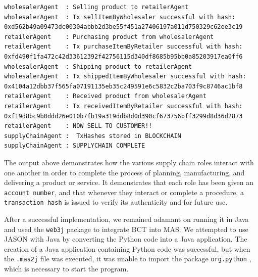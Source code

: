 \begin{lstlisting}[numbers=none, basicstyle=\ttfamily\tiny]
wholesalerAgent  : Selling product to retailerAgent
wholesalerAgent  : Tx sellItemByWholesaler successful with hash: 0xd562b49a09473dc00304abbb2d3be55f451a27406197a011d750329c62ee3c19
retailerAgent    : Purchasing product from wholesalerAgent
retailerAgent    : Tx purchaseItemByRetailer successful with hash: 0xfd490f1fa472c42d33612392f42756115d340df8685b95bb0a85203917ea0ff6
wholesalerAgent  : Shipping product to retailerAgent
wholesalerAgent  : Tx shippedItemByWholesaler successful with hash: 0x4104a12dbb37f565fa07191135eb35c249591e6c5832c2ba703f9c8746ac1bf8
retailerAgent    : Received product from wholesalerAgent
retailerAgent    : Tx receivedItemByRetailer successful with hash: 0xf19d8bc9b0ddd26e010b7fb19a319ddb8d0d390cf673756bff3299d8d36d2873
retailerAgent    : NOW SELL TO CUSTOMER!!
supplyChainAgent :  TxHashes stored in BLOCKCHAIN
supplyChainAgent : SUPPLYCHAIN COMPLETE
\end{lstlisting}

\vspace{.5cm}

The output above demonstrates how the various supply chain roles interact with one another in order to complete the process of planning, manufacturing, and delivering a product or service. It demonstrates that each role has been given an \texttt{account number}, and that whenever they interact or complete a procedure, a \texttt{transaction hash} is issued to verify its authenticity and for future use.

\vspace{.5cm}

After a successful implementation, we remained adamant on running it in Java and used the \texttt{web3j} package to integrate \ac{BCT} into \ac{MAS}. We attempted to use JASON with Java by converting the Python code into a Java application. The creation of a Java application containing Python code was successful, but when the \texttt{.mas2j} file was executed, it was unable to import the package \texttt{org.python} , which is necessary to start the program.